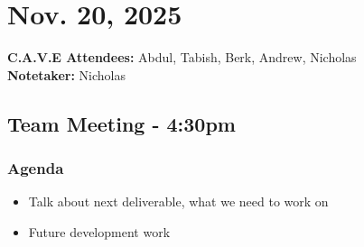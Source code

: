 	\pagebreak
	\section*{Nov. 20, 2025}

	\textbf{C.A.V.E Attendees:} Abdul, Tabish, Berk, Andrew, Nicholas\\
	\textbf{Notetaker:} Nicholas

	\subsection*{Team Meeting - 4:30pm}
		\subsubsection*{Agenda}
			\begin{itemize}
				\item Talk about next deliverable, what we need to work on 
				\item Future development work
			\end{itemize}

